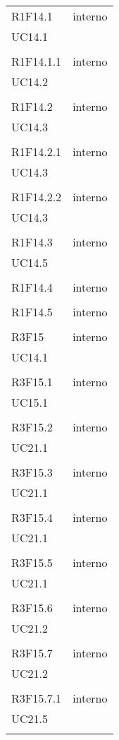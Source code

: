 \begin{longtable}{ >{\centering}p{}
		>{\centering}p{}}
	R1F14.1 & interno\\UC14.1\\\tabularnewline
	
	R1F14.1.1 & interno\\UC14.2\\\tabularnewline
	
	R1F14.2 & interno\\UC14.3\\\tabularnewline
	
	R1F14.2.1 & interno\\UC14.3\\\tabularnewline
	
	R1F14.2.2 & interno\\UC14.3\\\tabularnewline
	
	R1F14.3 & interno\\UC14.5\\\tabularnewline
	
	R1F14.4 & interno\\\tabularnewline
	
	R1F14.5 & interno\\\tabularnewline
	
	R3F15 & interno\\UC14.1\\\tabularnewline
	
	R3F15.1 & interno\\UC15.1\\\tabularnewline
	
	R3F15.2 & interno\\UC21.1\\\tabularnewline
	
	R3F15.3 & interno\\UC21.1\\\tabularnewline
	
	R3F15.4 & interno\\UC21.1\\\tabularnewline
	
	R3F15.5 & interno\\UC21.1\\\tabularnewline
	
	R3F15.6 & interno\\UC21.2\\\tabularnewline
	
	R3F15.7 & interno\\UC21.2\\\tabularnewline
	
	R3F15.7.1 & interno\\UC21.5\\\tabularnewline
	

\end{longtable}
